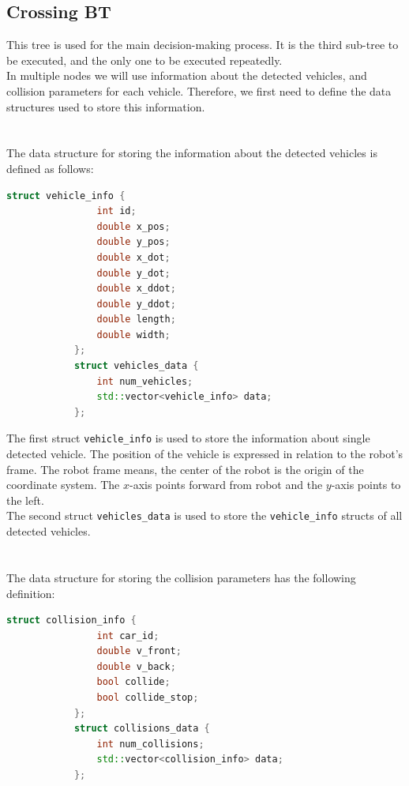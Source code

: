 \subsection{Crossing BT}
\label{sec:Crossing-BT-impl}
    This tree is used for the main decision-making process. It is the third sub-tree to be executed, and the only one to be executed repeatedly.\\
    In multiple nodes we will use information about the detected vehicles, and collision parameters for each vehicle. Therefore, we first need to define the data structures used to store this information.\\\\
    \\
        The data structure for storing the information about the detected vehicles is defined as follows:
        \begin{lstlisting}[language=C++, caption={Vehicle data structure}, label={lst:vehicle_data}]
            struct vehicle_info {
                int id;
                double x_pos;
                double y_pos;
                double x_dot;
                double y_dot;
                double x_ddot;
                double y_ddot;
                double length;
                double width;
            };
            struct vehicles_data {
                int num_vehicles;
                std::vector<vehicle_info> data;
            };
        \end{lstlisting}
        The first struct \texttt{vehicle\_info} is used to store the information about single detected vehicle. The position of the vehicle is expressed in relation to the robot's frame. The robot frame means, the center of the robot is the origin of the coordinate system. The $x$-axis points forward from robot and the $y$-axis points to the left.\\
        The second struct \texttt{vehicles\_data} is used to store the \texttt{vehicle\_info} structs of all detected vehicles.\\\\
    \\
        The data structure for storing the collision parameters has the following definition:
        \begin{lstlisting}[language=C++, caption={Collision data structure}, label={lst:collision_data}]
            struct collision_info {
                int car_id;
                double v_front;
                double v_back;
                bool collide;
                bool collide_stop;
            };
            struct collisions_data {
                int num_collisions;
                std::vector<collision_info> data;
            };
        \end{lstlisting}
